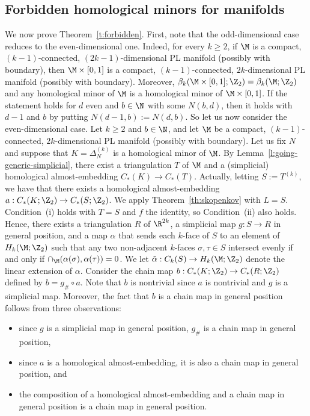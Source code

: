 \subsection{Forbidden homological minors for manifolds}
%
We now prove Theorem~\ref{t:forbidden}. First, note that the odd-dimensional case reduces to the even-dimensional one. Indeed, for every $k \ge 2$, if $\M$ is a compact, $(k-1)$-connected, $(2k-1)$-dimensional PL manifold (possibly with boundary), then $\M \times [0,1]$ is a compact, $(k-1)$-connected, $2k$-dimensional PL manifold (possibly with boundary). Moreover, $\beta_{k}(\M \times [0,1];\Z_2) = \beta_{k}(\M;\Z_2)$ and any homological minor of $\M$ is a homological minor of $\M \times [0,1]$. If the statement holds for $d$ even and $b \in \N$ with some $N(b,d)$, then it holds with $d-1$ and $b$ by putting $N(d-1,b) := N(d,b)$. So let us now consider the even-dimensional case.
%
\medskip
%
 Let $k \ge 2$ and $b \in \N$, and let $\M$ be a compact, $(k-1)$-connected, $2k$-dimensional PL manifold (possibly with boundary). Let us fix $N$ and suppose that $K = \Delta_N^{(k)}$ is a homological minor of $\M$. By Lemma~\ref{l:going-generic-simplicial}, there exist a triangulation $T$ of $\M$ and a (simplicial) homological almost-embedding $C_*(K)\to C_*(T)$. Actually, letting $S := T^{(k)}$, we have that there exists a homological almost-embedding $a:C_*(K;\Z_2) \to  C_*(S;\Z_2)$.
%
  \medskip
%
  We apply Theorem~\ref{th:skopenkov} with $L=S$. Condition~(i) holds with $T=S$ and $f$ the identity, so Condition~(ii) also holds. Hence, there exists a triangulation $R$ of $\R^{2k}$, a simplicial map $g:S \to R$ in general position, and a map $\alpha$ that sends each $k$-face of $S$ to an element of $H_k(\M;\Z_2)$ such that any two non-adjacent $k$-faces $\sigma,\tau \in S$ intersect evenly if and only if $\cap_{\M}(\alpha(\sigma),\alpha(\tau)) = 0$. We let $\tilde{\alpha}:C_k(S) \to H_k(\M;\Z_2)$ denote the linear extension of $\alpha$.
%
\medskip
%
Consider the chain map $b:C_*(K;\Z_2) \to C_*(R;\Z_2)$ defined by $b = g_\# \circ a$. Note that $b$ is nontrivial since $a$ is nontrivial and $g$ is a simplicial map. Moreover, the fact that $b$ is a chain map in general position follows from three observations:
%
\begin{itemize}
\item since $g$ is a simplicial map in general position, $g_\#$ is a chain map in general position,
\item since $a$ is a homological almost-embedding, it is also a chain map in general position, and 
\item the composition of a homological almost-embedding and a chain map in general position is a chain map in general position.
\end{itemize}
